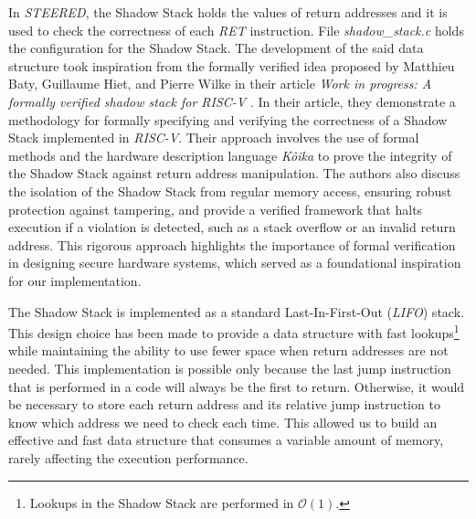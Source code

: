 In \textit{STEERED}, the Shadow Stack holds the values of return addresses and it
is used to check the correctness of each \textit{RET} instruction. File \textit{shadow\_stack.c}
holds the configuration for the Shadow Stack. The development of the said data structure
took inspiration from the formally verified idea proposed by Matthieu Baty,
Guillaume Hiet, and Pierre Wilke in their article \textit{Work in progress: A formally
verified shadow stack for RISC-V} \cite{shadowstack}. In their article, they
demonstrate a methodology for formally specifying and verifying the correctness
of a Shadow Stack implemented in \textit{RISC-V}. Their approach involves the
use of formal methods and the hardware description language \textit{Kôika}\cite{koika}
to prove the integrity of the Shadow Stack against return address manipulation. The
authors also discuss the isolation of the Shadow Stack from regular memory access,
ensuring robust protection against tampering, and provide a verified framework that
halts execution if a violation is detected, such as a stack overflow or an
invalid return address. This rigorous approach highlights the importance of formal
verification in designing secure hardware systems, which served as a
foundational inspiration for our implementation.

The Shadow Stack is implemented as a standard Last-In-First-Out (\textit{LIFO}) stack.
This design choice has been made to provide a data structure with fast lookups\footnote{Lookups
in the Shadow Stack are performed in $\mathcal{O}(1)$.} while maintaining the ability
to use fewer space when return addresses are not needed. This implementation is
possible only because the last jump instruction that is performed in a code will
always be the first to return. Otherwise, it would be necessary to store each
return address and its relative jump instruction to know which address we need
to check each time. This allowed us to build an effective and fast data structure
that consumes a variable amount of memory, rarely affecting the execution
performance.

